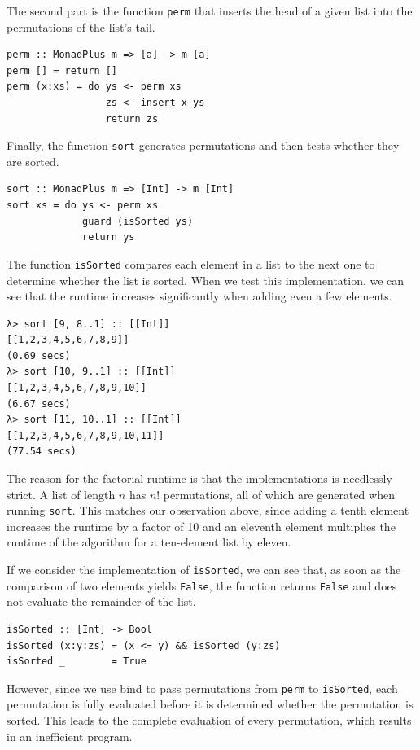 \documentclass[a4paper, 11pt, fleqn, twoside]{scrreprt}
\newcommand{\hinl}[1]{\texttt{#1}}
\begin{document}
The second part is the function \hinl{perm} that inserts the head of a given list into the permutations of the list's tail.

\begin{verbatim}
perm :: MonadPlus m => [a] -> m [a]
perm [] = return []
perm (x:xs) = do ys <- perm xs
                 zs <- insert x ys
                 return zs
\end{verbatim}

Finally, the function \hinl{sort} generates permutations and then tests whether they are sorted.

\begin{verbatim}
sort :: MonadPlus m => [Int] -> m [Int]
sort xs = do ys <- perm xs
             guard (isSorted ys)
             return ys
\end{verbatim}

The function \hinl{isSorted} compares each element in a list to the next one to determine whether the list is sorted.
When we test this implementation, we can see that the runtime increases significantly when adding even a few elements.

\begin{verbatim}
λ> sort [9, 8..1] :: [[Int]]
[[1,2,3,4,5,6,7,8,9]]
(0.69 secs)
λ> sort [10, 9..1] :: [[Int]]
[[1,2,3,4,5,6,7,8,9,10]]
(6.67 secs)
λ> sort [11, 10..1] :: [[Int]]
[[1,2,3,4,5,6,7,8,9,10,11]]
(77.54 secs)
\end{verbatim}

The reason for the factorial runtime is that the implementations is needlessly strict.
A list of length $n$  has $n!$ permutations, all of which are generated when running \hinl{sort}.
This matches our observation above, since adding a tenth element increases the runtime by a factor of 10 and an eleventh element multiplies the runtime of the algorithm for a ten-element list by eleven.

If we consider the implementation of \hinl{isSorted}, we can see that, as soon as the comparison of two elements yields \hinl{False}, the function returns \hinl{False} and does not evaluate the remainder of the list.

\begin{verbatim}
isSorted :: [Int] -> Bool
isSorted (x:y:zs) = (x <= y) && isSorted (y:zs)
isSorted _        = True
\end{verbatim}

However, since we use bind to pass permutations from \hinl{perm} to \hinl{isSorted}, each permutation is fully evaluated before it is determined whether the permutation is sorted.
This leads to the complete evaluation of every permutation, which results in an inefficient program.
\end{document}
